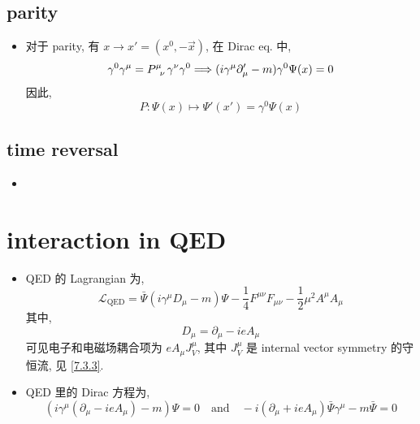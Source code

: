 \subsection{parity}
\begin{itemize}
	\item 对于 parity, 有 $x \rightarrow x' = (x^0, - \vec{x})$, 在 Dirac eq. 中,
	\begin{equation}
		\gamma^0 \gamma^\mu = \tensor{P}{^\mu_\nu} \gamma^\nu \gamma^0 \Longrightarrow (i \gamma^\mu \partial'_\mu - m) \gamma^0 \Psi(x) = 0
	\end{equation}
	因此,
	\begin{equation}
		P : \Psi(x) \mapsto \Psi'(x') = \gamma^0 \Psi(x)
	\end{equation}
\end{itemize}

\subsection{time reversal}
\begin{itemize}
	\item 
\end{itemize}

\section{interaction in QED}
\begin{itemize}
	\item QED 的 Lagrangian 为,
	\begin{equation}
		\mathcal{L}_\text{QED} = \bar{\Psi} (i \gamma^\mu D_\mu - m) \Psi - \frac{1}{4} F^{\mu \nu} F_{\mu \nu} - \frac{1}{2} \mu^2 A^\mu A_\mu
	\end{equation}
	其中,
	\begin{equation}
		D_\mu = \partial_\mu - i e A_\mu
	\end{equation}
	可见电子和电磁场耦合项为 $e A_\mu J_V^\mu$, 其中 $J_V^\mu$ 是 internal vector symmetry 的守恒流, 见 \eqref{7.3.3}.
	
	\item QED 里的 Dirac 方程为,
	\begin{equation}
		(i \gamma^\mu (\partial_\mu - i e A_\mu) - m) \Psi = 0 \quad \text{and} \quad - i (\partial_\mu + i e A_\mu) \bar{\Psi} \gamma^\mu - m \bar{\Psi} = 0
	\end{equation}
\end{itemize}

